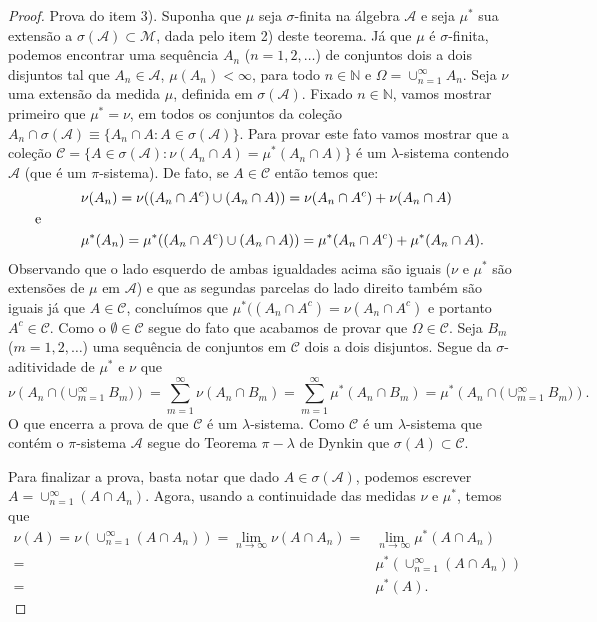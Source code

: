 \begin{proof}
Prova do item 3). 
Suponha que $ \mu$ seja $\sigma$-finita 
na álgebra $\mathcal{A}$ e seja
$\mu^*$ sua extensão a $\sigma(\mathcal{A}) \subset \mathcal{M}$, 
dada pelo item 2) deste teorema. Já que $\mu$ é $\sigma$-finita, podemos
encontrar uma sequência $A_n$ ($n=1,2,\ldots$) de conjuntos
dois a dois disjuntos tal que 
$A_n\in \mathcal{A}$, $\mu(A_n)<\infty$, para todo $n\in\mathbb{N}$ e 
$\Omega = \cup_{n=1}^{\infty} A_n$. 
Seja $\nu$ uma extensão da medida $\mu$, definida em $\sigma(\mathcal{A})$.
Fixado $n\in\mathbb{N}$, vamos mostrar primeiro que $\mu^{*} = \nu$, 
em todos os conjuntos da coleção 
$
A_n\cap \sigma(\mathcal{A}) \equiv \{ A_n\cap A: A\in\sigma(\mathcal{A})\}.
$
Para provar este fato vamos mostrar que a coleção 
$
\mathcal{C} = \{ A\in \sigma(\mathcal{A}) : \nu(A_n\cap A) = \mu^*(A_n\cap A)\}
$
é um $\lambda$-sistema contendo $\mathcal{A}$ (que é um $\pi$-sistema). 
De fato, se $A \in\mathcal{C}$ então temos que: 
\begin{align*}
	&\nu(A_n) =
	\nu((A_n\cap A^c) \cup (A_n\cap A)) 
	= 
	\nu(A_n\cap A^c)+ \nu(A_n\cap A)
\\
\text{e}\hspace*{1cm}&
\\
	&\mu^*(A_n) =
	\mu^*((A_n\cap A^c) \cup (A_n\cap A)) 
	= 
	\mu^*(A_n\cap A^c)+ \mu^*(A_n\cap A).
\end{align*}
Observando que o lado esquerdo de ambas igualdades acima são iguais
($\nu$ e $\mu^*$ são extensões de $\mu$ em $\mathcal{A}$) 
e que as segundas parcelas do lado direito também são iguais 
já que $A\in\mathcal{C}$, concluímos que $\mu^*((A_n\cap A^c)= \nu(A_n\cap A^c)$ 
e portanto $A^c\in\mathcal{C}$. 
Como o $\emptyset\in\mathcal{C}$ segue do fato que acabamos de provar que
$\Omega\in\mathcal{C}$. 
Seja $B_m$ ($m=1,2,\ldots$) uma sequência de conjuntos em 
$\mathcal{C}$ dois a dois disjuntos. Segue da $\sigma$-aditividade
de $\mu^*$ e $\nu$ que 
$$
\nu\left( A_n \cap \big(\cup_{m=1}^{\infty}B_m\big) \right)
=
\sum_{m=1}^{\infty} \nu\left( A_n \cap B_m \right)
=
\sum_{m=1}^{\infty} \mu^*\left( A_n \cap B_m \right)
=
\mu^*\left( A_n \cap \big(\cup_{m=1}^{\infty}B_m\big) \right).
$$
O que encerra a prova de que $\mathcal{C}$ é um $\lambda$-sistema.
Como $\mathcal{C}$ é um $\lambda$-sistema que contém o $\pi$-sistema
$\mathcal{A}$ segue do Teorema $\pi-\lambda$ de Dynkin que 
$\sigma(A)\subset \mathcal{C}$.


Para finalizar a prova, basta notar que dado $A\in \sigma(\mathcal{A})$, 
podemos escrever
$A=\cup_{n=1}^{\infty} (A\cap A_n)$.
Agora, usando a continuidade das medidas $\nu$ e $\mu^*$,
temos que  
\begin{align*}
\nu(A) = \nu\left( \cup_{n=1}^{\infty} (A\cap A_n) \right)
	   = \lim_{n\to\infty} \nu(A\cap A_n)
	   =& \lim_{n\to\infty} \mu^{*}(A\cap A_n)
	   \\[0.2cm]
	   =& \mu^*( \cup_{n=1}^{\infty} (A\cap A_n) )
	   \\[0.2cm]
	   =& \mu^*(A).
\end{align*}
\end{proof}